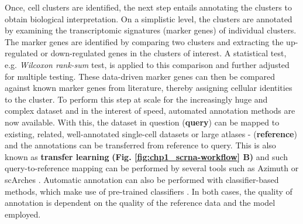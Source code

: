 \par Once, cell clusters are identified, the next step entails annotating the clusters to obtain biological interpretation. On a simplistic level, the clusters are annotated by examining the transcriptomic signatures (marker genes) of individual clusters. The marker genes are identified by comparing two clusters and extracting the up-regulated or down-regulated genes in the clusters of interest. A statistical test, e.g. \textit{Wilcoxon rank-sum} test, is applied to this comparison and further adjusted for multiple testing. These data-driven marker genes can then be compared against known marker genes from literature, thereby assigning cellular identities to the cluster. To perform this step at scale for the increasingly huge and complex dataset and in the interest of speed, automated annotation methods are now available. With this, the dataset in question (\textbf{query}) can be mapped to existing, related, well-annotated single-cell datasets or large atlases 
- (\textbf{reference}) and the annotations can be transferred from reference to query. This is also known as \textbf{transfer learning} \textbf{(Fig. \ref{fig:chp1_scrna-workflow} B)} and such query-to-reference mapping can be performed by several tools such as Azimuth \textbf{\cite{hao_integrated_2021}} or scArches \textbf{\cite{lotfollahi_mapping_2021}}. Automatic annotation can also be performed with classifier-based methods, which make use of pre-trained classifiers \textbf{\cite{dominguez_conde_cross-tissue_2022,fu_clustifyr_2020}}. In both cases, the quality of annotation is dependent on the quality of the reference data and the model employed.\\




